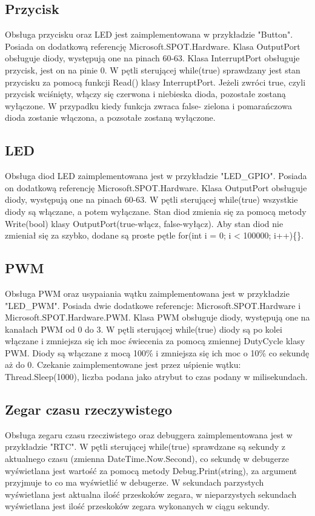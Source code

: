 \documentclass{article}
\begin{document}
\subsection{Przycisk}
Obsługa przycisku oraz LED jest zaimplementowana w przykładzie "Button". Posiada on dodatkową referencję Microsoft.SPOT.Hardware. Klasa OutputPort obsługuje diody, występują one na pinach 60-63. Klasa InterruptPort obsługuje przycisk, jest on na pinie 0. W pętli sterującej while(true) sprawdzany jest stan przycisku za pomocą funkcji Read() klasy InterruptPort. Jeżeli zwróci true, czyli przycisk wciśnięty, włączy się czerwona i niebieska dioda, pozostałe zostaną wyłączone. W przypadku kiedy funkcja zwraca false- zielona i pomarańczowa dioda zostanie włączona, a pozsotałe zostaną wyłączone.

\subsection{LED}
Obsługa diod LED zaimplementowana jest w przykładzie "LED\_GPIO". Posiada on dodatkową referencję Microsoft.SPOT.Hardware. Klasa OutputPort obsługuje diody, występują one na pinach 60-63. W pętli sterującej while(true) wszystkie diody są włączane, a potem wyłączane. Stan diod zmienia się za pomocą metody Write(bool) klasy OutputPort(true-włącz, false-wyłącz). Aby stan diod nie zmieniał się za szybko, dodane są proste pętle for(int i = 0; i < 100000; i++)\{\}.

\subsection{PWM}
Obsługa PWM oraz usypaiania wątku zaimplementowana jest w przykładzie "LED\_PWM". Posiada dwie dodatkowe referencje: Microsoft.SPOT.Hardware i Microsoft.SPOT.Hardware.PWM. Klasa PWM obsługuje diody, występują one na kanałach PWM od 0 do 3. W pętli sterującej while(true) diody są po kolei włączane i zmniejsza się ich moc świecenia za pomocą zmiennej DutyCycle klasy PWM. Diody są włączane z mocą 100\% i zmniejsza się ich moc o 10\% co sekundę aż do 0. Czekanie zaimplementowane jest przez uśpienie wątku: Thread.Sleep(1000), liczba podana jako atrybut to czas podany w milisekundach.

\subsection{Zegar czasu rzeczywistego}
Obsługa zegaru czasu rzecziwistego oraz debuggera zaimplementowana jest w przykładzie "RTC". W pętli sterującej while(true) sprawdzane są sekundy z aktualnego czasu (zmienna DateTime.Now.Second), co sekundę w debugerze wyświetlana jest wartość za pomocą metody Debug.Print(string), za argument przyjmuje to co ma wyświetlić w debugerze. W sekundach parzystych wyświetlana jest aktualna ilość przeskoków zegara, w nieparzystych sekundach wyświetlana jest ilość przeskoków zegara wykonanych w ciągu sekundy.
\end{document}
